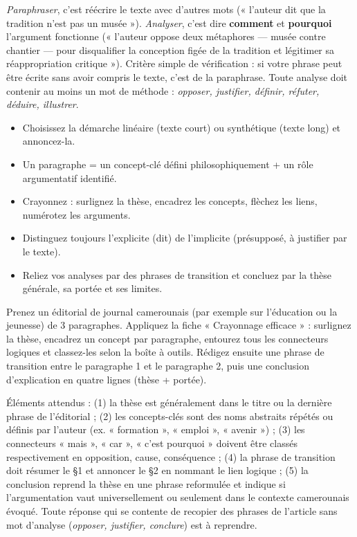 \documentclass[11pt]{article}
\begin{document}
\begin{attention}
\emph{Paraphraser}, c'est réécrire le texte avec d'autres mots (« l'auteur dit que la tradition n'est pas un musée »). \emph{Analyser}, c'est dire \textbf{comment} et \textbf{pourquoi} l'argument fonctionne (« l'auteur oppose deux métaphores — musée contre chantier — pour disqualifier la conception figée de la tradition et légitimer sa réappropriation critique »). Critère simple de vérification : si votre phrase peut être écrite sans avoir compris le texte, c'est de la paraphrase. Toute analyse doit contenir au moins un mot de méthode : \emph{opposer, justifier, définir, réfuter, déduire, illustrer}.
\end{attention}

\begin{aretenir}
\begin{itemize}
\item Choisissez la démarche linéaire (texte court) ou synthétique (texte long) et annoncez-la.
\item Un paragraphe = un concept-clé défini philosophiquement + un rôle argumentatif identifié.
\item Crayonnez : surlignez la thèse, encadrez les concepts, flèchez les liens, numérotez les arguments.
\item Distinguez toujours l'explicite (dit) de l'implicite (présupposé, à justifier par le texte).
\item Reliez vos analyses par des phrases de transition et concluez par la thèse générale, sa portée et ses limites.
\end{itemize}
\end{aretenir}

\begin{exercice}[Entraînement]
Prenez un éditorial de journal camerounais (par exemple sur l'éducation ou la jeunesse) de 3 paragraphes. Appliquez la fiche « Crayonnage efficace » : surlignez la thèse, encadrez un concept par paragraphe, entourez tous les connecteurs logiques et classez-les selon la boîte à outils. Rédigez ensuite une phrase de transition entre le paragraphe 1 et le paragraphe 2, puis une conclusion d'explication en quatre lignes (thèse + portée).
\end{exercice}

\begin{corrige}[Exercice 1]
Éléments attendus : (1) la thèse est généralement dans le titre ou la dernière phrase de l'éditorial ; (2) les concepts-clés sont des noms abstraits répétés ou définis par l'auteur (ex. « formation », « emploi », « avenir ») ; (3) les connecteurs « mais », « car », « c'est pourquoi » doivent être classés respectivement en opposition, cause, conséquence ; (4) la phrase de transition doit résumer le §1 et annoncer le §2 en nommant le lien logique ; (5) la conclusion reprend la thèse en une phrase reformulée et indique si l'argumentation vaut universellement ou seulement dans le contexte camerounais évoqué. Toute réponse qui se contente de recopier des phrases de l'article sans mot d'analyse (\emph{opposer, justifier, conclure}) est à reprendre.
\end{corrige}
\end{document}
